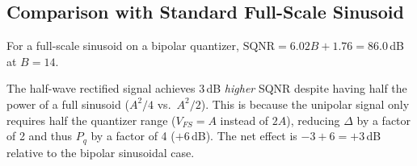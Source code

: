 \documentclass{article}
\begin{document}
  \subsection{Comparison with Standard Full-Scale Sinusoid}

  For a full-scale sinusoid on a bipolar quantizer, $\text{SQNR} = 6.02B + 1.76 = 86.0$\,dB at $B = 14$.

  The half-wave rectified signal achieves 3\,dB \emph{higher} SQNR despite having half the power of a full sinusoid ($A^2/4$
  vs.\ $A^2/2$). This is because the unipolar signal only requires half the quantizer range ($V_{FS} = A$ instead of $2A$),
  reducing $\Delta$ by a factor of 2 and thus $P_q$ by a factor of 4 ($+6$\,dB). The net effect is $-3 + 6 = +3$\,dB relative to
   the bipolar sinusoidal case.
\end{document}

